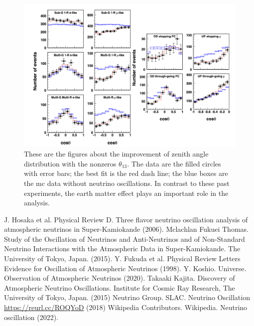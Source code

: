 \documentclass[12pt]{article}
\begin{document}
    \begin{figure}[H]
        \centering
        \includegraphics[width = 1\textwidth]{../figure/result2.png}
        \caption{These are the figures about the improvement of zenith angle distribution with the nonzeros $\theta_{13}$. The data are the filled circles with error bars; the best fit is the red dash line; the blue boxes are the mc data without neutrino oscillations. In contrast to these past experiments, the earth matter effect plays an important role in the analysis. \cite{SKexp}}
        \label{result2}
    \end{figure}

\begin{multicols}{2}

\begin{thebibliography}{1}

	
     J. Hosaka et al. Physical Review D. Three flavor neutrino oscillation analysis of atmospheric neutrinos in Super-Kamiokande (2006).
     Mclachlan Fukuei Thomas. Study of the Oscillation of Neutrinos and Anti-Neutrinos and of Non-Standard Neutrino Interactions with the Atmospheric Data in Super-Kamiokande. The University of Tokyo, Japan. (2015).
     Y. Fukuda et al. Physical Review Letters Evidence for Oscillation of Atmospheric Neutrinos (1998).
    Y. Koshio. Universe. Observation of Atmospheric Neutrinos (2020).
    \bibitem{}Takaaki Kajita. Discovery of Atmospheric Neutrino Oscillations. Institute for Cosmic Ray Research, The University of Tokyo, Japan. (2015)
     Neutrino Group. SLAC. Neutrino Oscillation \url{https://reurl.cc/ROQYoD} (2018)
     Wikipedia Contributors. Wikipedia. Neutrino oscillation (2022).
    
\end{thebibliography}

\end{multicols}
\end{document}
